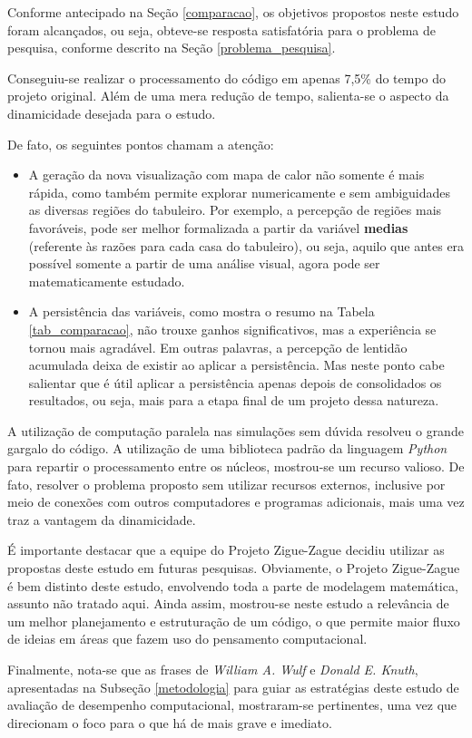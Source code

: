 \documentclass[12pt]{article}
\begin{document}
Conforme antecipado na Seção \ref{comparacao}, os objetivos propostos neste estudo foram alcançados, ou seja, obteve-se resposta satisfatória para o problema de pesquisa, conforme descrito na Seção \ref{problema_pesquisa}.

Conseguiu-se realizar o processamento do código em apenas 7,5\% do tempo do projeto original. Além de uma mera redução de tempo, salienta-se o aspecto da dinamicidade desejada para o estudo. 

De fato, os seguintes pontos chamam a atenção:

\begin{itemize}
	\item A geração da nova visualização com mapa de calor não somente é mais rápida, como também permite explorar numericamente e sem ambiguidades as diversas regiões do tabuleiro. Por exemplo, a percepção de regiões mais favoráveis, pode ser melhor formalizada a partir da variável \textbf{medias} (referente às razões para cada casa do tabuleiro), ou seja, aquilo que antes era possível somente a partir de uma análise visual, agora pode ser matematicamente estudado.
	
	\item A persistência das variáveis, como mostra o resumo na Tabela \ref{tab_comparacao}, não trouxe ganhos significativos, mas a experiência se tornou mais agradável. Em outras palavras, a percepção de lentidão acumulada deixa de existir ao aplicar a persistência. Mas neste ponto cabe salientar que é útil aplicar a persistência apenas depois de consolidados os resultados, ou seja, mais para a etapa final de um projeto dessa natureza.
\end{itemize}

A utilização de computação paralela nas simulações sem dúvida resolveu o grande gargalo do código. A utilização de uma biblioteca padrão da linguagem \textit{Python} para repartir o processamento entre os núcleos, mostrou-se um recurso valioso. De fato, resolver o problema proposto sem utilizar recursos externos, inclusive por meio de conexões com outros computadores e programas adicionais, mais uma vez traz a vantagem da dinamicidade.

É importante destacar que a equipe do Projeto Zigue-Zague decidiu utilizar as propostas deste estudo em futuras pesquisas. Obviamente, o Projeto Zigue-Zague é bem distinto deste estudo, envolvendo toda a parte de modelagem matemática, assunto não tratado aqui. Ainda assim, mostrou-se neste estudo a relevância de um melhor planejamento e estruturação de um código, o que permite maior fluxo de ideias em áreas que fazem uso do pensamento computacional.

Finalmente, nota-se que as frases de \textit{William A. Wulf} e \textit{Donald E. Knuth}, apresentadas na Subseção \ref{metodologia} para guiar as estratégias deste estudo de avaliação de desempenho computacional, mostraram-se pertinentes, uma vez que direcionam o foco para o que há de mais grave e imediato. 






\end{document}
